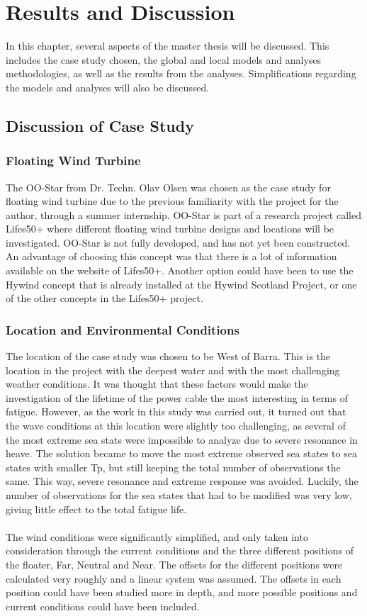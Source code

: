 \chapter{Results and Discussion}
\label{chap:discussion}
 In this chapter, several aspects of the master thesis will be discussed. This includes the case study chosen, the global and local models and analyses methodologies, as well as the results from the analyses. Simplifications regarding the models and analyses will also be discussed. 
 \section{Discussion of Case Study}
 \subsection{Floating Wind Turbine}
The OO-Star from Dr. Techn. Olav Olsen was chosen as the case study for floating wind turbine due to the previous familiarity with the project for the author, through a summer internship. OO-Star is part of a research project called Lifes50+ where different floating wind turbine designs and locations will be investigated. OO-Star is not fully developed, and has not yet been constructed. An advantage of choosing this concept was that there is a lot of information available on the website of Lifes50+. Another option could have been to use the Hywind concept that is already installed at the Hywind Scotland Project, or one of the other concepts in the Lifes50+ project.
\subsection{Location and Environmental Conditions}
The location of the case study was chosen to be West of Barra. This is the location in the project with the deepest water and with the most challenging weather conditions. It was thought that these factors would make the investigation of the lifetime of the power cable the most interesting in terms of fatigue. However, as the work in this study was carried out, it turned out that the wave conditions at this location were slightly too challenging, as several of the most extreme sea stats were impossible to analyze due to severe resonance in heave. The solution became to move the most extreme observed sea states to sea states with smaller Tp, but still keeping the total number of observations the same. This way, severe resonance and extreme response was avoided. Luckily, the number of observations for the sea states that had to be modified was very low, giving little effect to the total fatigue life.\\\\
The wind conditions were significantly simplified, and only taken into consideration through the current conditions and the three different positions of the floater, Far, Neutral and Near. The offsets for the different positions were calculated very roughly and a linear system was assumed. The offsets in each position could have been studied more in depth, and more possible positions and current conditions could have been included. 


